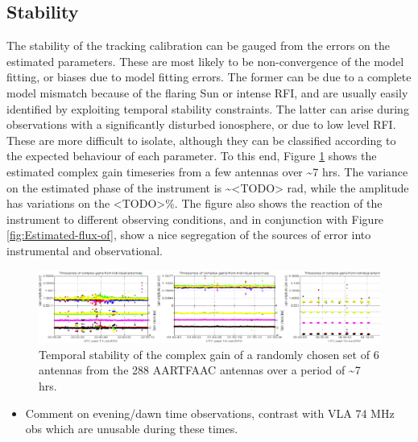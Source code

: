 \documentclass{aa}
\begin{document}



\subsection{\label{sub:Stability}Stability}

The stability of  the tracking calibration can be gauged from  the errors on the
estimated parameters. These  are most likely to be  non-convergence of the model
fitting, or  biases due  to model  fitting errors. The  former can  be due  to a
complete  model mismatch  because of  the flaring  Sun or  intense RFI,  and are
usually  easily identified  by  exploiting temporal  stability constraints.  The
latter can arise during  observations with a significantly disturbed ionosphere,
or due to low level RFI. These  are more difficult to isolate, although they can
be classified  according to  the expected behaviour  of each parameter.  To this
end, Figure  \ref{fig:gain-Temporal-stability} shows the  estimated complex gain
timeseries from a few antennas  over \textasciitilde{}7 hrs. The variance on the
estimated  phase of  the instrument  is \textasciitilde{}<TODO>  rad,  while the
amplitude has variations on the <TODO>\%.  The figure also shows the reaction of
the instrument to different observing conditions, and in conjunction with Figure
\ref{fig:Estimated-flux-of},  show a nice  segregation of  the sources  of error
into instrumental and observational.

\begin{figure}[tbh]
\includegraphics[width=1\textwidth]{Figs/combined_plot_gains}\caption{\label{fig:gain-Temporal-stability}Temporal stability of the complex
gain of a randomly chosen set of 6 antennas from the 288 AARTFAAC
antennas over a period of \textasciitilde{}7 hrs.}
\end{figure}

\begin{itemize}
\item Comment on evening/dawn time observations, contrast with VLA 74 MHz
obs which are unusable during these times.
\end{itemize}
\end{document}
